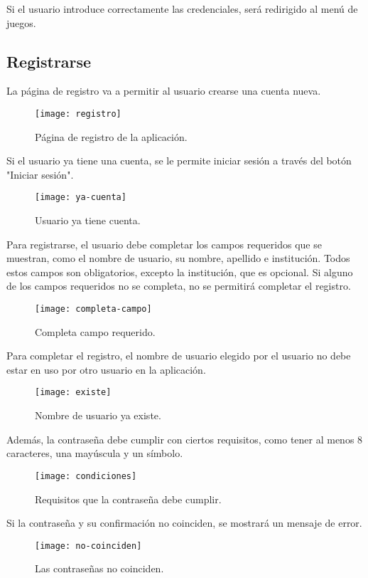 Si el usuario introduce correctamente las credenciales, será redirigido al menú de juegos.

\subsection{Registrarse}
La página de registro va a permitir al usuario crearse una cuenta nueva.
\begin{figure}[htb]
\centering
\texttt{[image: registro]}
\caption{Página de registro de la aplicación.}
\label{fig:registro}
\end{figure}

Si el usuario ya tiene una cuenta, se le permite iniciar sesión a través del botón "Iniciar sesión".

\begin{figure}[htb]
\centering
\texttt{[image: ya-cuenta]}
\caption{Usuario ya tiene cuenta.}
\label{fig:ya-cuenta}
\end{figure}

Para registrarse, el usuario debe completar los campos requeridos que se muestran, como el nombre de usuario, su nombre, apellido e institución. Todos estos campos son obligatorios, excepto la institución, que es opcional. Si alguno de los campos requeridos no se completa, no se permitirá completar el registro.
\newpage
\begin{figure}[htb]
\centering
\texttt{[image: completa-campo]}
\caption{Completa campo requerido.}
\label{fig:completa-campo}
\end{figure}

Para completar el registro, el nombre de usuario elegido por el usuario no debe estar en uso por otro usuario en la aplicación.

\begin{figure}[htb]
\centering
\texttt{[image: existe]}
\caption{Nombre de usuario ya existe.}
\label{fig:existe}
\end{figure}

Además, la contraseña debe cumplir con ciertos requisitos, como tener al menos 8 caracteres, una mayúscula y un símbolo.
\newpage
\begin{figure}[htb]
\centering
\texttt{[image: condiciones]}
\caption{Requisitos que la contraseña debe cumplir.}
\label{fig:condiciones}
\end{figure}

Si la contraseña y su confirmación no coinciden, se mostrará un mensaje de error.
\begin{figure}[htb]
\centering
\texttt{[image: no-coinciden]}
\caption{Las contraseñas no coinciden.}
\label{fig:no-coinciden}
\end{figure}


